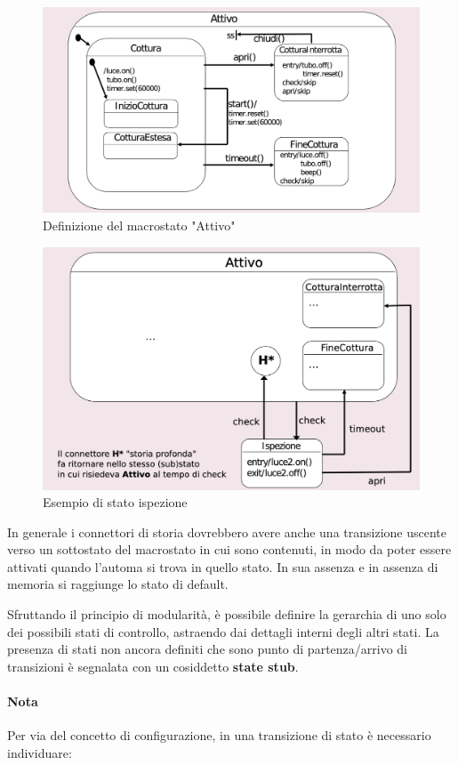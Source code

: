 \begin{figure}[h!]
    \centering
    \includegraphics[width=0.75\linewidth]{assets/UML/state/state6.png}
    \caption{Definizione del macrostato "Attivo"}
\end{figure}

\begin{figure}[h!]
    \centering
    \includegraphics[width=0.75\linewidth]{assets/UML/state/state7.png}
    \caption{Esempio di stato ispezione}
\end{figure}

In generale i connettori di storia dovrebbero avere anche una transizione uscente verso un sottostato del macrostato in cui sono contenuti, in modo da poter essere attivati quando l'automa si trova in quello stato. In sua assenza e in assenza di memoria si raggiunge lo stato di default.

Sfruttando il principio di modularità, è possibile definire la gerarchia di uno solo dei possibili stati di controllo, astraendo dai dettagli interni degli altri stati. La presenza di stati non ancora definiti che sono punto di partenza/arrivo di transizioni è segnalata con un cosiddetto \textbf{state stub}.

\paragraph{Nota} Per via del concetto di configurazione, in una transizione di stato è necessario individuare:

